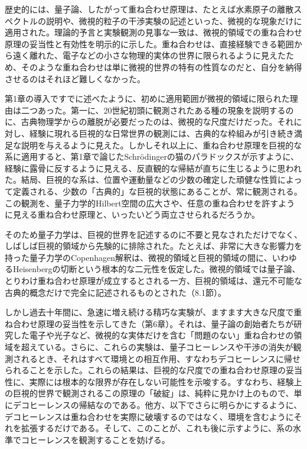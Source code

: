歴史的には、量子論、したがって重ね合わせ原理は、たとえば水素原子の離散スペクトルの説明や、微視的粒子の干渉実験の記述といった、微視的な現象だけに適用された。理論的予言と実験観測の見事な一致は、微視的領域での重ね合わせ原理の妥当性と有効性を明示的に示した。重ね合わせは、直接経験できる範囲から遠く離れた、電子などの小さな物理的実体の世界に限られるように見えたため、そのような重ね合わせは単に微視的世界の特有の性質なのだと、自分を納得させるのはそれほど難しくなかった。

\hypertarget{srcpage:27}{}\label{srcpage:27}
第1章の導入ですでに述べたように、初めに適用範囲が微視的領域に限られた理由は二つあった。第一に、20世紀初頭に観測されたある種の現象を説明するのに、古典物理学からの離脱が必要だったのは、微視的な尺度だけだった。それに対し、経験に現れる巨視的な日常世界の観測には、古典的な枠組みが引き続き満足な説明を与えるように見えた。しかしそれ以上に、重ね合わせ原理を巨視的な系に適用すると、第1章で論じたSchrödingerの猫のパラドックスが示すように、経験に露骨に反するように見える、反直観的な帰結が直ちに生じるように思われた。結局、巨視的な系は、位置や運動量などの少数の確定した頑健な性質によって定義される、少数の「古典的」な巨視的状態にあることが、常に観測される。この観測を、量子力学的Hilbert空間の広大さや、任意の重ね合わせを許すように見える重ね合わせ原理と、いったいどう両立させられるだろうか。

そのため量子力学は、巨視的世界を記述するのに不要と見なされただけでなく、しばしば巨視的領域から先験的に排除された。たとえば、非常に大きな影響力を持った量子力学のCopenhagen解釈は、微視的領域と巨視的領域の間に、いわゆるHeisenbergの切断という根本的な二元性を仮定した。微視的領域では量子論、とりわけ重ね合わせ原理が成立するとされる一方、巨視的領域は、還元不可能な古典的概念だけで完全に記述されるものとされた（8.1節）。

しかし過去十年間に、急速に増え続ける精巧な実験が、ますます大きな尺度で重ね合わせ原理の妥当性を示してきた（第6章）。それは、量子論の創始者たちが研究した電子や光子など、微視的な実体だけを含む「問題のない」重ね合わせの領域を超えている。さらに、これらの実験は、量子コヒーレンスや干渉の消失が観測されるとき、それはすべて環境との相互作用、すなわちデコヒーレンスに帰せられることを示した。これらの結果は、巨視的な尺度での重ね合わせ原理の妥当性に、実際には根本的な限界が存在しない可能性を示唆する。すなわち、経験上の巨視的世界で観測されるこの原理の「破綻」は、純粋に見かけ上のもので、単にデコヒーレンスの帰結なのである。他方、以下でさらに明らかにするように、デコヒーレンスは重ね合わせを実際に破壊するのではなく、環境を含むようにそれを拡張するだけである。そして、このことが、これも後に示すように、系の水準でコヒーレンスを観測することを妨げる。

